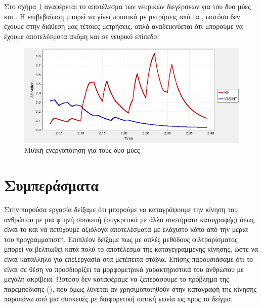 Στο σχήμα \ref{fig:rf-vasint-activation} αναφέρεται το αποτέλεσμα των νευρικών διεγέρσεων για του δυο μύες  και . Η επιβεβαίωση μπορεί να γίνει ποιοτικά με μετρήσεις από τα , ωστόσο δεν έχουμε στην διάθεση μας τέτοιες μετρήσεις, απλά αναδεικνύεται ότι μπορούμε να έχουμε αποτελέσματα ακόμη και σε νευρικό επίπεδο.

\begin{figure}[H]
    \centering
    \includegraphics[width=0.8\linewidth, keepaspectratio]{fig/rf-vasint-activation.png}
    \caption{Μυϊκή ενεργοποίηση για τους δυο μύες}
    \label{fig:rf-vasint-activation}
\end{figure}


\section{Συμπεράσματα}

Στην παρούσα εργασία δείξαμε ότι μπορούμε να καταγράψουμε την κίνηση του ανθρώπου με μια φτηνή συσκευή (συγκριτικά με άλλα συστήματα καταγραφής) όπως είναι το  και να πετύχουμε αξιόλογα αποτελέσματα με ελάχιστο κόπο από την μεριά του προγραμματιστή. Επιπλέον δείξαμε πως με απλές μεθόδους φιλτραρίσματος μπορεί να βελτιωθεί κατά πολύ το αποτέλεσμα της καταγεγραμμένης κίνησης, ώστε να είναι κατάλληλο για επεξεργασία στα μετέπειτα στάδια. Επίσης παρουσιάσαμε ότι το  είναι σε θέση να προσδιορίζει τα μορφομετρικά χαρακτηριστικά του ανθρώπου με μεγάλη ακρίβεια. Ωστόσο δεν καταφέραμε να ξεπεράσουμε το πρόβλημα της παρεμπόδισης (), που όμως λύνεται αν χρησιμοποιηθούν στην καταγραφή της κίνησης παραπάνω από μια συσκευές με διαφορετική οπτική γωνία ως προς το δείγμα.

